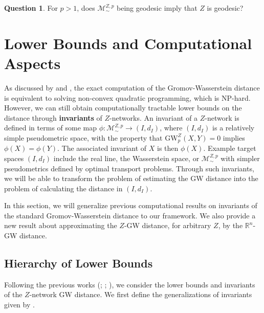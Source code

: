 \documentclass[twoside,11pt]{article}
\theoremstyle{definition}
\newtheorem{question}[theorem]{Question}
\newcommand{\M}{\mathcal{M}}
\newcommand{\MZp}{\M_{\sim}^{Z,p}}
\newcommand{\dgwz}{\mathrm{GW}_p^Z}
\begin{document}
\begin{question}\label{question:converse_geodesic}
For $p>1$,  does $\MZp$ being geodesic imply that $Z$ is geodesic?
\end{question}


\section{Lower Bounds and Computational Aspects}\label{sec:approximations}

As discussed by  \citet{memoli2011} and \citet{chowdhury2019gromov}, the exact computation of the Gromov-Wasserstein distance is equivalent to solving non-convex quadratic programming, which is NP-hard. However, we can still obtain computationally tractable lower bounds on the distance through \textbf{invariants} of $Z$-networks. An invariant of a $Z$-network is defined in terms of some map $\phi:\MZp \to (I,d_I)$, where $(I,d_I)$ is a relatively simple pseudometric space, with the property that $\dgwz(X,Y) = 0$ implies $\phi(X) = \phi(Y)$. The associated invariant of $X$ is then $\phi(X)$. Example target spaces $(I,d_I)$ include the real line, the Wasserstein space, or $\MZp$ with simpler pseudometrics defined by optimal transport problems. Through such invariants, we will be able to transform the problem of estimating the GW distance into the problem of calculating the distance in $(I, d_I)$.

In this section, we will generalize previous computational results on invariants of the standard Gromov-Wasserstein distance to our framework. We also provide a new result about approximating the $Z$-GW distance, for arbitrary $Z$, by the $\mathbb{R}^n$-GW distance.

\subsection{Hierarchy of Lower Bounds}
Following the previous works (\citealt[Section 3]{chowdhury2019gromov}; \citealt[Section 6]{memoli2007}; \citealt[Section 6]{memoli2011}), we consider the lower bounds and invariants of the $Z$-network GW distance. We first define the generalizations of invariants given by \citet[Section 3]{chowdhury2019gromov}.
\end{document}
